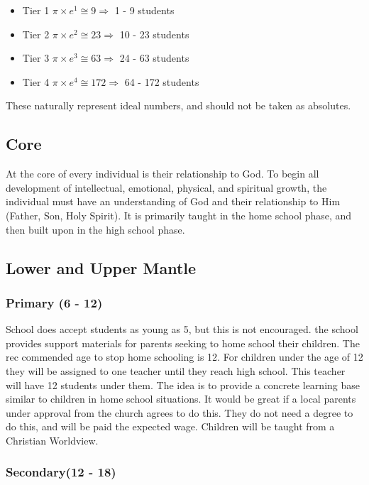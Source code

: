 \documentclass[CSHFoundation.tex]{subfiles}
\begin{document}
\begin{itemize}
\item Tier 1 $ \pi \times e^{1} \cong 9 \Longrightarrow $ 1 - 9 students
\item Tier 2 $ \pi \times e^{2} \cong 23 \Longrightarrow $ 10 - 23 students
\item Tier 3 $ \pi \times e^{3} \cong 63 \Longrightarrow $ 24 - 63 students
\item Tier 4 $ \pi \times e^{4} \cong 172 \Longrightarrow $ 64 - 172 students
\end{itemize}

These naturally represent ideal numbers, and should not be taken as absolutes. 


\subsection{Core}

At the core of every individual is their relationship to God. To begin all development of intellectual, emotional, physical, and spiritual growth, the individual must have an understanding of God and their relationship to Him (Father, Son, Holy Spirit). It is primarily taught in the home school phase, and then built upon in the high school phase.


\subsection{Lower and Upper Mantle}

\subsubsection{Primary (6 - 12)}



School does accept students as young as 5, but this is not encouraged. the school provides support materials for parents seeking to home school their children. The rec commended age to stop home schooling is 12. For children under the age of 12 they will be assigned to one teacher until they reach high school. This teacher will have 12 students under them. The idea is to provide a concrete learning base similar to children in home school situations. It would be great if a local parents under approval from the church agrees to do this. They do not need a degree to do this, and will be paid the expected wage. Children will be taught from a Christian Worldview.

\subsubsection{Secondary(12 - 18)}
\end{document}
